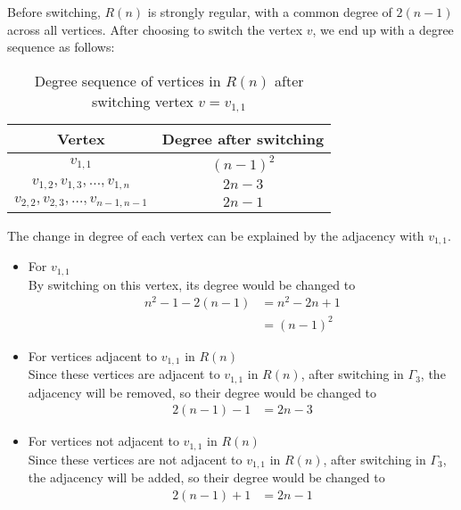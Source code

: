 Before switching, $R(n)$ is strongly regular, with a common degree of $2(n-1)$ across all vertices. After choosing to switch the vertex $v$, we end up with a degree sequence as follows:

\begin{table}[h!]
    \centering
    \begin{tabular}{|c|c|}
        \hline
        \textbf{Vertex} & \textbf{Degree after switching} \\
        \hline
        \( v_{1,1} \) & \( (n - 1)^2 \) \\
        \( v_{1,2}, v_{1,3}, \dots, v_{1,n} \) & \( 2n - 3 \) \\
        \( v_{2,2}, v_{2,3}, \dots, v_{n-1,n-1} \) & \( 2n - 1 \) \\
        \hline
    \end{tabular}
    \caption{Degree sequence of vertices in \( R(n) \) after switching vertex \( v = v_{1,1} \)}
\end{table}

The change in degree of each vertex can be explained by the adjacency with $v_{1,1}$.
\begin{itemize}
    \item For $v_{1,1}$\\
    By switching on this vertex, its degree would be changed to
    \begin{align*}
        n^2-1 -2(n-1) &= n^2 -2n +1\\&=(n-1)^2
    \end{align*}

    \item For vertices adjacent to $v_{1,1}$ in $R(n)$\\
    Since these vertices are adjacent to $v_{1,1}$ in $R(n)$, after switching in $\Gamma_3$, the adjacency will be removed, so their degree would be changed to
    \begin{align*}
        2(n-1) - 1 &= 2n-3
    \end{align*}

    \item For vertices not adjacent to $v_{1,1}$ in $R(n)$\\
    Since these vertices are not adjacent to $v_{1,1}$ in $R(n)$, after switching in $\Gamma_3$, the adjacency will be added, so their degree would be changed to
    \begin{align*}
        2(n-1) + 1 &= 2n-1
    \end{align*}
\end{itemize}

